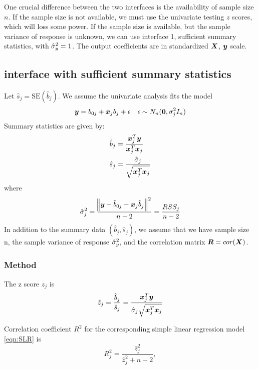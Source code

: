 One crucial difference between the two interfaces is the availability of sample size $n$. If the sample size is not available, we must use the univariate testing $z$ scores, which will loss some power. If the sample size is available, but the sample variance of response is unknown, we can use interface 1, sufficient summary statistics, with $\hat{\sigma}_y^2 = 1$. The output coefficients are in standardized $\bm X$, $\bm y$ scale.

\subsection{\susie interface with sufficient summary statistics}
Let $\hat{s}_j = \text{SE}(\hat{b}_j)$. We assume the univariate analysis fits the model
\begin{equation}\label{eqn:SLR}
    \bm y = b_{0j} + \bm x_j b_j + \epsilon \quad \epsilon\sim N_n(\bm{0}, \sigma_j^2 I_n)
\end{equation}
Summary statistics are given by:
\begin{align}
    \hat{b}_{j} &= \frac{\bm x_{j}^{T}\bm y}{\bm x_{j}^{T}\bm x_{j}} \\
    \hat{s}_{j} &= \frac{\hat{\sigma}_{j}}{\sqrt{\bm x_{j}^{T}\bm x_{j}}} \label{eqn:shat}
\end{align}
where
\begin{equation}
    \hat{\sigma}_{j}^{2} = \frac{\norm{\bm y - \hat{b}_{0j} - \bm x_{j} \hat{b}_{j}}^2}{n-2} = \frac{RSS_{j}}{n-2}
\end{equation}
In addition to the summary data $(\hat{b}_j, \hat{s}_j)$, we assume that we have sample size n, the sample variance of response $\hat{\sigma}_y^2$, and the correlation matrix $\bm R = cor(\bm X)$.

\subsubsection{Method}

The z score $\hat{z}_j$ is
\begin{equation}
     \hat{z}_{j} = \frac{\hat{b}_{j}}{\hat{s}_{j}} = \frac{\bm x_{j}^{T}\bm y}{\hat{\sigma}_{j}\sqrt{\bm x_{j}^{T}\bm x_{j}}}
\end{equation}
\begin{proposition} \label{prop:Cor Coeff}
Correlation coefficient $R^2$ for the corresponding simple linear regression model \eqref{eqn:SLR} is
\begin{equation}
    R_{j}^2 = \frac{\hat{z}_{j}^2}{\hat{z}_{j}^2+n-2},
\end{equation}
\end{proposition}

